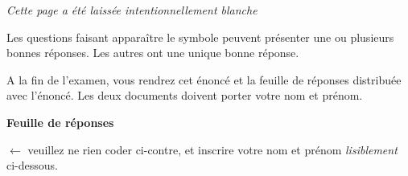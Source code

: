 \documentclass[a4paper]{article}
\begin{document}
{\newpage

\vspace{3cm}

\begin{center}
	\textit{Cette page a été laissée intentionnellement blanche}
\end{center}


\newpage

{
\em\setlength{\parindent}{0pt}

Les questions faisant apparaître le symbole \multiSymbole{} peuvent
  présenter une ou plusieurs bonnes réponses. Les autres ont
  une unique bonne réponse.
\newline

A la fin de l'examen, vous rendrez cet énoncé et la feuille de réponses distribuée avec l'énoncé.
  Les deux documents doivent porter votre nom et prénom.
\newline


}\hspace*{\fill}
\vspace{1ex}




%

\AMCcleardoublepage    

\AMCdebutFormulaire    

{\large\bf\noindent Feuille de réponses}

{\setlength{\parindent}{0pt}\hspace*{\fill}

\hspace*{\fill}
\begin{minipage}[b]{6.5cm}\setlength{\parindent}{0pt}
$\longleftarrow{}$\hspace{0pt plus 1cm} veuillez ne rien coder ci-contre,
et inscrire votre nom et prénom \textit{lisiblement} ci-dessous.

\vspace{1ex}

\hfill{}
\end{minipage}}}
\end{document}
